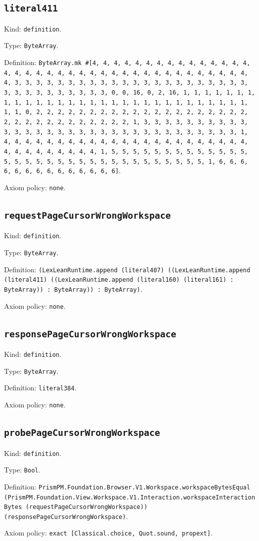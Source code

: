 \documentclass[11pt]{article}
\begin{document}
\subsection*{\texttt{literal411}}
\noindent Kind: \texttt{definition}.\par
\noindent Type: \texttt{ByteArray}.\par
\noindent Definition: \texttt{ByteArray.mk \#[4, 4, 4, 4, 4, 4, 4, 4, 4, 4, 4, 4, 4, 4, 4, 4, 4, 4, 4, 4, 4, 4, 4, 4, 4, 4, 4, 4, 4, 4, 4, 4, 4, 4, 4, 4, 4, 4, 4, 3, 3, 3, 3, 3, 3, 3, 3, 3, 3, 3, 3, 3, 3, 3, 3, 3, 3, 3, 3, 3, 3, 3, 3, 3, 3, 3, 3, 3, 3, 3, 3, 0, 0, 16, 0, 2, 16, 1, 1, 1, 1, 1, 1, 1, 1, 1, 1, 1, 1, 1, 1, 1, 1, 1, 1, 1, 1, 1, 1, 1, 1, 1, 1, 1, 1, 1, 1, 1, 1, 0, 2, 2, 2, 2, 2, 2, 2, 2, 2, 2, 2, 2, 2, 2, 2, 2, 2, 2, 2, 2, 2, 2, 2, 2, 2, 2, 2, 2, 2, 2, 2, 2, 1, 3, 3, 3, 3, 3, 3, 3, 3, 3, 3, 3, 3, 3, 3, 3, 3, 3, 3, 3, 3, 3, 3, 3, 3, 3, 3, 3, 3, 3, 3, 3, 3, 1, 4, 4, 4, 4, 4, 4, 4, 4, 4, 4, 4, 4, 4, 4, 4, 4, 4, 4, 4, 4, 4, 4, 4, 4, 4, 4, 4, 4, 4, 4, 4, 4, 1, 5, 5, 5, 5, 5, 5, 5, 5, 5, 5, 5, 5, 5, 5, 5, 5, 5, 5, 5, 5, 5, 5, 5, 5, 5, 5, 5, 5, 5, 5, 5, 5, 1, 6, 6, 6, 6, 6, 6, 6, 6, 6, 6, 6, 6, 6, 6]}.\par
\noindent Axiom policy: \texttt{none}.\par
\subsection*{\texttt{requestPageCursorWrongWorkspace}}
\noindent Kind: \texttt{definition}.\par
\noindent Type: \texttt{ByteArray}.\par
\noindent Definition: \texttt{(LexLeanRuntime.append (literal407) ((LexLeanRuntime.append (literal411) ((LexLeanRuntime.append (literal160) (literal161) : ByteArray)) : ByteArray)) : ByteArray)}.\par
\noindent Axiom policy: \texttt{none}.\par
\subsection*{\texttt{responsePageCursorWrongWorkspace}}
\noindent Kind: \texttt{definition}.\par
\noindent Type: \texttt{ByteArray}.\par
\noindent Definition: \texttt{literal384}.\par
\noindent Axiom policy: \texttt{none}.\par
\subsection*{\texttt{probePageCursorWrongWorkspace}}
\noindent Kind: \texttt{definition}.\par
\noindent Type: \texttt{Bool}.\par
\noindent Definition: \texttt{PrismPM.Foundation.Browser.V1.Workspace.workspaceBytesEqual (PrismPM.Foundation.View.Workspace.V1.Interaction.workspaceInteractionBytes (requestPageCursorWrongWorkspace)) (responsePageCursorWrongWorkspace)}.\par
\noindent Axiom policy: \texttt{exact [Classical.choice, Quot.sound, propext]}.\par
\end{document}
